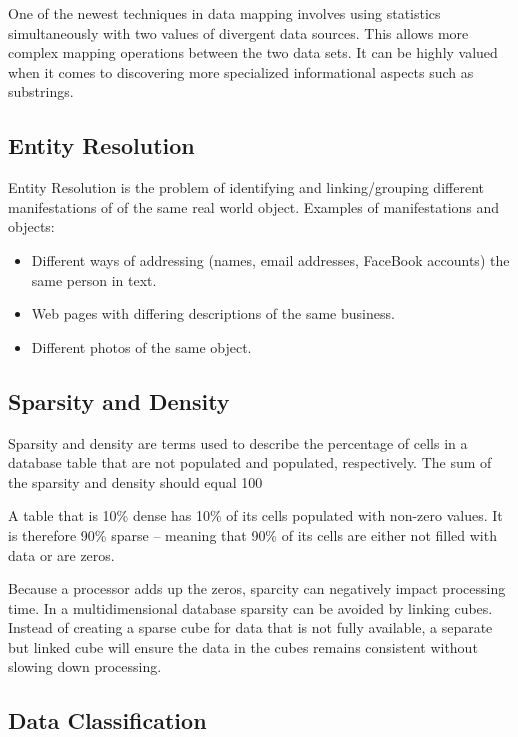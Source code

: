 \documentclass[12pt]{article}
\begin{document}
One of the newest techniques in data mapping involves using statistics simultaneously with two values of divergent data sources. This allows more complex mapping operations between the two data sets. It can be highly valued when it comes to discovering more specialized informational aspects such as substrings.
\subsection{Entity Resolution}

Entity Resolution is the problem of identifying and linking/grouping different manifestations of of the same real world object. Examples of manifestations and objects:
\begin{itemize}
\item Different ways of addressing (names, email addresses, FaceBook
accounts) the same person in text.
\item Web pages with differing descriptions of the same business.
\item Different photos of the same object.
\end{itemize} 

\subsection{Sparsity and Density}
Sparsity and density are terms used to describe the percentage of cells in a database table that are not populated and populated, respectively. The sum of the sparsity and density should equal 100%

A table that is 10\% dense has 10\% of its cells populated with non-zero values. It is therefore 90\% sparse – meaning that 90\% of its cells are either not filled with data or are zeros.

Because a processor adds up the zeros, sparcity can negatively impact processing time. In a multidimensional database sparsity can be avoided by linking cubes. Instead of creating a sparse cube for data that is not fully available, a separate but linked cube will ensure the data in the cubes remains consistent without slowing down processing.



\subsection{Data Classification}
\end{document}
